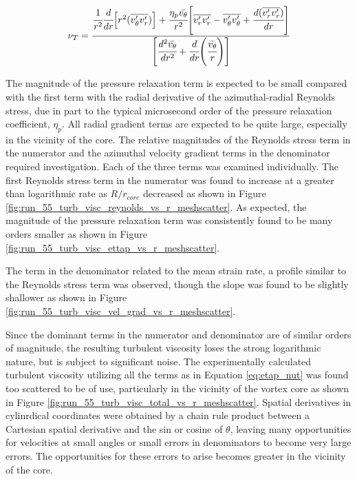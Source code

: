 \begin{equation}
\nu_T =
    \cfrac{\cfrac{1}{r^2}\cfrac{d}{dr}\Big[r^2 (\overline{v_{\theta}^\prime 
    v_{r}^\prime})\Big] +
	\cfrac{\eta_p \bar{v_\theta}}{r^2}\Bigg[\overline{v_{r}^\prime 
	v_{r}^\prime} - 
	\overline{v_{\theta}^\prime v_{\theta}^\prime} + 
	\cfrac{d(\overline{v_{r}^\prime 
	v_{r}^\prime})}{dr}\Bigg]} {\Bigg[\cfrac{d^2 \bar{v_{\theta}}}{dr^2} + 
	\cfrac{d}{dr}
	\Bigg(\cfrac{\bar{v_{\theta}}}{r}\Bigg)\Bigg]}
\label{eq:etap_nut}
\end{equation}

\noindent
The magnitude of the pressure relaxation term is expected to be small compared 
with the first term with the radial derivative of the azimuthal-radial Reynolds 
stress, due in part to the typical microsecond order of the pressure relaxation 
coefficient, $\eta_p$. All radial gradient terms are expected to be quite 
large, especially in the vicinity of the core. The relative magnitudes of the 
Reynolds stress term in the numerator and the azimuthal velocity gradient terms 
in the denominator required investigation. Each of the three 
terms was examined individually. The first Reynolds stress term in the 
numerator was found to increase at a greater than logarithmic rate as 
$R/r_{core}$ decreased as shown in Figure 
\ref{fig:run_55_turb_visc_reynolds_vs_r_meshscatter}. As expected, the 
magnitude of the pressure relaxation term was consistently found to be many 
orders smaller as shown in Figure 
\ref{fig:run_55_turb_visc_ettap_vs_r_meshscatter}.




The term in the denominator related to the mean strain rate, a profile similar 
to the Reynolds stress term was observed, 
though the slope was found to be slightly shallower as shown in Figure 
\ref{fig:run_55_turb_visc_vel_grad_vs_r_meshscatter}.




Since the dominant terms in the numerator and denominator are of similar orders 
of magnitude, the resulting turbulent viscosity loses the strong logarithmic 
nature, but is subject to significant noise. The experimentally 
calculated turbulent viscosity utilizing all the terms as in Equation 
\ref{eq:etap_nut} was found too scattered to be of use, particularly in the 
vicinity of the vortex core as shown in Figure 
\ref{fig:run_55_turb_visc_total_vs_r_meshscatter}. Spatial derivatives in 
cylinrdical coordinates were obtained by a chain rule product between a 
Cartesian spatial derivative and the sin or cosine of $\theta$, leaving many 
opportunities for velocities at small angles or small errors in denominators to 
become very large errors. The opportunities for these errors to arise becomes 
greater in the vicinity of the core.

